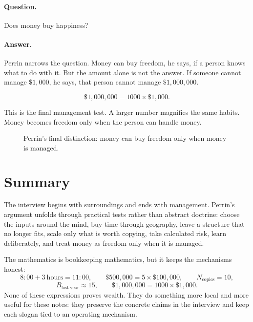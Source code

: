 \paragraph{Question.}
Does money buy happiness?

\paragraph{Answer.}
Perrin narrows the question. Money can buy freedom, he says, if a person knows what to do with it. But the amount alone is not the answer. If someone cannot manage \(\$1{,}000\), he says, that person cannot manage \(\$1{,}000{,}000\).

\begin{equation}
\$1{,}000{,}000 = 1000 \times \$1{,}000.
\end{equation}

This is the final management test. A larger number magnifies the same habits. Money becomes freedom only when the person can handle money.

\begin{figure}
\centering
{}
\caption{Perrin's final distinction: money can buy freedom only when money is managed.}
\end{figure}

\section{Summary}

The interview begins with surroundings and ends with management. Perrin's argument unfolds through practical tests rather than abstract doctrine: choose the inputs around the mind, buy time through geography, leave a structure that no longer fits, scale only what is worth copying, take calculated risk, learn deliberately, and treat money as freedom only when it is managed.

The mathematics is bookkeeping mathematics, but it keeps the mechanisms honest:
\[
8{:}00+3\ \mathrm{hours}=11{:}00,\qquad
\$500{,}000=5\times\$100{,}000,\qquad
N_{\mathrm{copies}}=10,
\]
\[
B_{\mathrm{last\ year}}\approx15,\qquad
\$1{,}000{,}000=1000\times\$1{,}000.
\]
None of these expressions proves wealth. They do something more local and more useful for these notes: they preserve the concrete claims in the interview and keep each slogan tied to an operating mechanism.